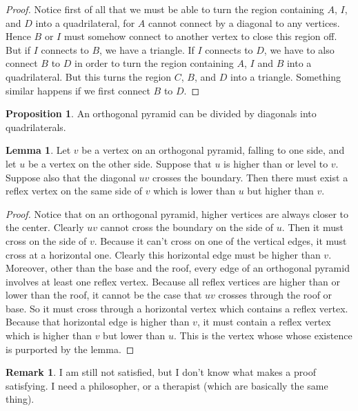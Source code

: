 \documentclass[12pt]{article}
\theoremstyle{definition}
\newtheorem{lemma}{Lemma}
\newtheorem{proposition}{Proposition}
\newtheorem{remark}{Remark}
\begin{document}
\begin{proof}

Notice first of all that we must be able to turn the region containing $A$, $I$, and $D$ into a quadrilateral, for $A$ cannot connect by a diagonal to any vertices. Hence $B$ or $I$ must somehow connect to another vertex to close this region off. But if $I$ connects to $B$, we have a triangle. If $I$ connects to $D$, we have to also connect $B$ to $D$ in order to turn the region containing $A$, $I$ and $B$ into a quadrilateral. But this turns the region $C$, $B$, and $D$ into a triangle. Something similar happens if we first connect $B$ to $D.$
\end{proof}


\begin{proposition}
An orthogonal pyramid can be divided by diagonals into quadrilaterals. 
\end{proposition}

\begin{lemma}

Let $v$ be a vertex on an orthogonal pyramid, falling to one side, and let $u$ be a vertex on the other side. Suppose that $u$ is higher than or level to $v$. Suppose also that the diagonal $uv$ crosses the boundary. Then there must exist a reflex vertex on the same side of $v$ which is lower than $u$ but higher than $v$.
\end{lemma}

\begin{proof}

Notice that on an orthogonal pyramid, higher vertices are always closer to the center. Clearly $uv$ cannot cross the boundary on the side of $u$. Then it must cross on the side of $v$. Because it can't cross on one of the vertical edges, it must cross at a horizontal one. Clearly this horizontal edge must be higher than $v$. Moreover, other than the base and the roof, every edge of an orthogonal pyramid involves at least one reflex vertex. Because all reflex vertices are higher than or lower than the roof, it cannot be the case that $uv$ crosses through the roof or base. So it must cross through a horizontal vertex which contains a reflex vertex. Because that horizontal edge is higher than $v$, it must contain a reflex vertex which is higher than $v$ but lower than $u$. This is the vertex whose whose existence is purported by the lemma.

\end{proof}

\begin{remark}
I am still not satisfied, but I don't know what makes a proof satisfying. I need a philosopher, or a therapist (which are basically the same thing).
\end{remark}
\end{document}

